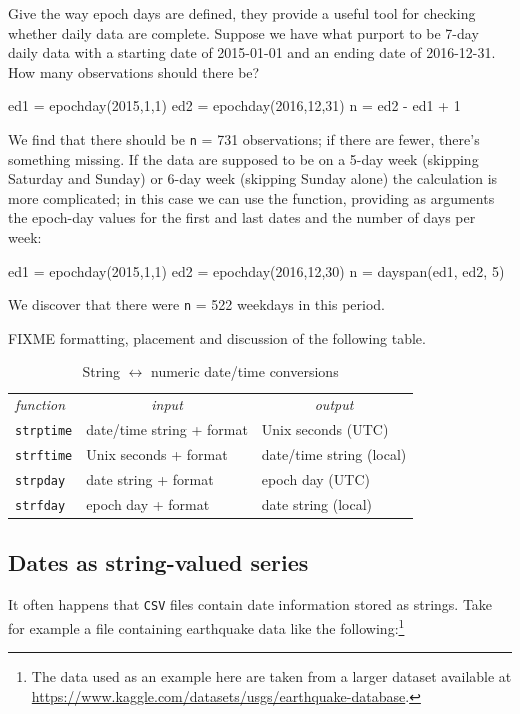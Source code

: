 Give the way epoch days are defined, they provide a useful tool for
checking whether daily data are complete. Suppose we have what purport
to be 7-day daily data with a starting date of 2015-01-01 and an
ending date of 2016-12-31. How many observations should there be?
%
\begin{code}
ed1 = epochday(2015,1,1)
ed2 = epochday(2016,12,31)
n = ed2 - ed1 + 1
\end{code}
We find that there should be \texttt{n} = 731 observations; if there
are fewer, there's something missing. If the data are supposed to be
on a 5-day week (skipping Saturday and Sunday) or 6-day week (skipping
Sunday alone) the calculation is more complicated; in this case we can
use the  function, providing as arguments the
epoch-day values for the first and last dates and the number of days
per week:
\begin{code}
ed1 = epochday(2015,1,1)
ed2 = epochday(2016,12,30)
n = dayspan(ed1, ed2, 5)
\end{code}
%
We discover that there were \texttt{n} = 522 weekdays in this period.


FIXME formatting, placement and discussion of the following table.

\begin{table}[htbp]
  \centering
  \begin{tabular}{lll}
    \textit{function} &
      \multicolumn{1}{c}{\textit{input}} &
        \multicolumn{1}{c}{\textit{output}} \\[6pt]
    \texttt{strptime} & date/time string + format & Unix seconds (UTC) \\
    \texttt{strftime} & Unix seconds + format & date/time string (local) \\[4pt]
    \texttt{strpday}  & date string + format & epoch day (UTC) \\
    \texttt{strfday}  & epoch day + format & date string (local)
  \end{tabular}
  \caption{String $\leftrightarrow$ numeric date/time conversions}
  \label{tab:timeconv}
\end{table}

\subsection{Dates as string-valued series}

It often happens that \texttt{CSV} files contain date information
stored as strings. Take for example a file containing earthquake data
like the following:\footnote{The data used as an example here are
  taken from a larger dataset available at
  \url{https://www.kaggle.com/datasets/usgs/earthquake-database}.}

